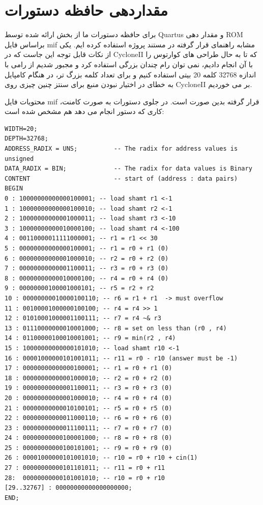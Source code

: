 \documentclass[12pt,titlepage,a4page , tikz , multi,table , svgnames,xcdraw]{article}
\begin{document}
\newpage

\section{مقداردهی حافظه دستورات}

برای حافظه دستورات ما از بخش  ارائه شده توسط Quartus و مقدار دهی ROM براساس فایل mif مشابه راهنمای قرار گرفته در مستند پروژه استفاده کرده ایم. یکی از نکات قابل توجه این جاست که در CycloneII که تا به حال طراحی های کوارتوس را با آن انجام دادیم، نمی توان رام چندان بزرگی استفاده کرد و مجبور شدیم از رامی با اندازه 32768 کلمه 20 بیتی استفاده کنیم و برای تعداد کلمه بزرگ تر، در هنگام کامپایل به خطای در اختیار نبودن منبع برای سنتز چنین چیزی روی CycloneII بر می خوردیم.

محتویات فایل mif قرار گرفته بدین صورت است. در جلوی دستورات به صورت کامنت، کاری که دستور انجام می دهد هم مشخص شده است:

\begin{latin}
\begin{verbatim}
WIDTH=20;
DEPTH=32768;
ADDRESS_RADIX = UNS;          -- The radix for address values is unsigned
DATA_RADIX = BIN;             -- The radix for data values is Binary
CONTENT                       -- start of (address : data pairs)
BEGIN
0 : 10000000000000100001; -- load shamt r1 <-1
1 : 10000000000000100010; -- load shamt r2 <-1
2 : 10000000000001000011; -- load shamt r3 <-10
3 : 10000000000010000100; -- load shamt r4 <-100
4 : 00110000011111000001; -- r1 = r1 << 30
5 : 00000000000000100001; -- r1 = r0 + r1 (0)
6 : 00000000000001000010; -- r2 = r0 + r2 (0)
7 : 00000000000001100011; -- r3 = r0 + r3 (0)
8 : 00000000000010000100; -- r4 = r0 + r4 (0)
9 : 00000000100001000101; -- r5 = r2 + r2
10 : 00000000010000100110; -- r6 = r1 + r1  -> must overflow
11 : 00100001000000100100; -- r4 = r4 >> 1
12 : 01010001000001100111; -- r7 = r4 ~& r3
13 : 01110000000010001000; -- r8 = set on less than (r0 , r4)
14 : 01100000100010001001; -- r9 = min(r2 , r4)
15 : 10000000000000101010; -- load shamt r10 <-1
16 : 00001000000101001011; -- r11 = r0 - r10 (answer must be -1)
17 : 00000000000000100001; -- r1 = r0 + r1 (0)
18 : 00000000000001000010; -- r2 = r0 + r2 (0)
19 : 00000000000001100011; -- r3 = r0 + r3 (0)
20 : 00000000000001000010; -- r4 = r0 + r4 (0)
21 : 00000000000010100101; -- r5 = r0 + r5 (0)
22 : 00000000000011000110; -- r6 = r0 + r6 (0)
23 : 00000000000011100111; -- r7 = r0 + r7 (0)
24 : 00000000000100001000; -- r8 = r0 + r8 (0)
25 : 00000000000100101001; -- r9 = r0 + r9 (0)
26 : 00001000000101001010; -- r10 = r0 + r10 + cin(1)
27 : 00000000000101101011; -- r11 = r0 + r11
28:  00000000000101001010; -- r10 = r0 + r10
[29..32767] : 00000000000000000000;
END;

\end{verbatim} 
\end{latin}
\end{document}
